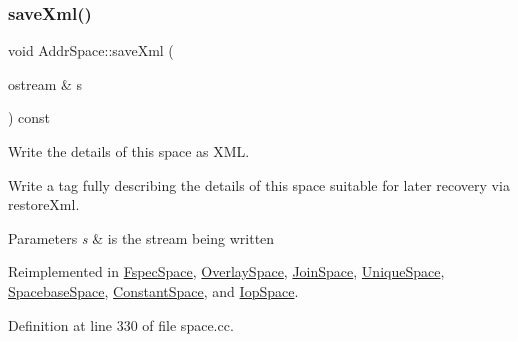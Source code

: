 \subsubsection{\texorpdfstring{saveXml()}{saveXml()}}
{\footnotesize\ttfamily void Addr\+Space\+::save\+Xml (\begin{DoxyParamCaption}\item[{ostream \&}]{s }\end{DoxyParamCaption}) const\hspace{0.3cm}{\ttfamily [virtual]}}



Write the details of this space as X\+ML. 

Write a tag fully describing the details of this space suitable for later recovery via restore\+Xml. 
\begin{DoxyParams}{Parameters}
{\em s} & is the stream being written \\
\hline
\end{DoxyParams}


Reimplemented in \mbox{\hyperlink{class_fspec_space_a3e1fd8f03e6fc9685988a070097b6b5a}{Fspec\+Space}}, \mbox{\hyperlink{class_overlay_space_a60c25f7c85366b0d7dd0fdf2755180b2}{Overlay\+Space}}, \mbox{\hyperlink{class_join_space_a7e7bdd3347396ca62a465041f13e06a1}{Join\+Space}}, \mbox{\hyperlink{class_unique_space_a119a41fbbdc811d44d532451ae2785f4}{Unique\+Space}}, \mbox{\hyperlink{class_spacebase_space_ae98cc5d0f6f46274b1942aca597ce2ce}{Spacebase\+Space}}, \mbox{\hyperlink{class_constant_space_a8af99121cbd9e7cea687d2a54cb98157}{Constant\+Space}}, and \mbox{\hyperlink{class_iop_space_a916e2a73cc1dd79b4f5d86ec6c39a9a4}{Iop\+Space}}.



Definition at line 330 of file space.\+cc.

